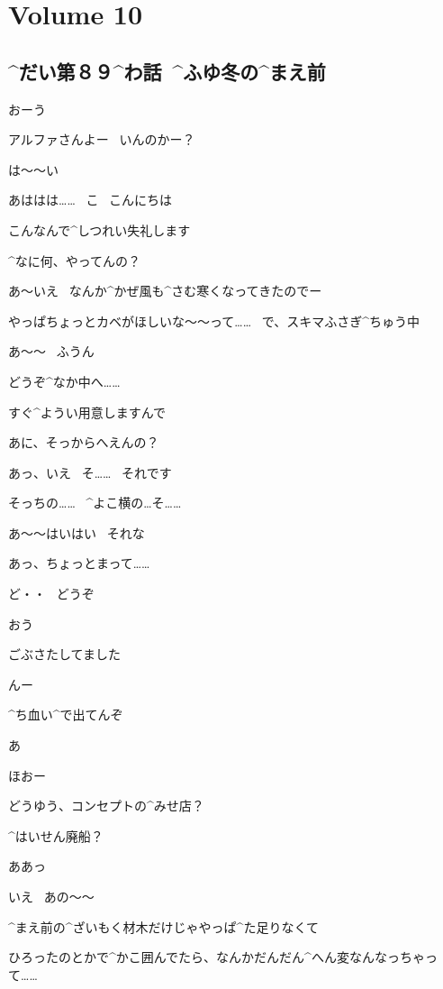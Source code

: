 \section{Volume 10}

\subsection{^{だい}{第}８９^{わ}{話}\ ^{ふゆ}{冬}の^{まえ}{前}}

\page[6]
\Ojisan おーう

\Ojisan アルファさんよー
\ いんのかー？

\page
\Alpha は〜〜い

\Alpha あははは……
\ こ
\ こんにちは

\Alpha こんなんで^{しつれい}{失礼}します

\Ojisan ^{なに}{何}、やってんの？

\Alpha あ〜いえ
\ なんか^{かぜ}{風}も^{さむ}{寒}くなってきたのでー

\Alpha やっぱちょっとカベがほしいな〜〜って……
\ で、スキマふさぎ^{ちゅう}{中}

\Ojisan あ〜〜
\ ふうん

\page
\Alpha どうぞ^{なか}{中}へ……

\Alpha すぐ^{ようい}{用意}しますんで

\Ojisan あに、そっからへえんの？

\Alpha あっ、いえ
\ そ……
\ それです

\Alpha そっちの……
\ ^{よこ}{横}の…そ……

\Ojisan あ〜〜はいはい
\ それな

\Alpha あっ、ちょっとまって……

\page
\Alpha ど・・
\ どうぞ

\Ojisan おう

\Alpha ごぶさたしてました

\Ojisan んー

\Ojisan ^{ち}{血}い^{で}{出}てんぞ

\Alpha あ

\page
\Ojisan ほおー

\Ojisan どうゆう、コンセプトの^{みせ}{店}？

\Ojisan ^{はいせん}{廃船}？

\Alpha ああっ

\Alpha いえ
\ あの〜〜

\page
\Alpha ^{まえ}{前}の^{ざいもく}{材木}だけじゃやっぱ^{た}{足}りなくて

\Alpha ひろったのとかで^{かこ}{囲}んでたら、なんかだんだん^{へん}{変}なんなっちゃって……

